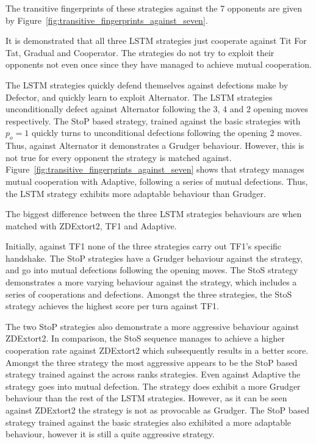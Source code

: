 The transitive fingerprints of these strategies against the 7 opponents are
given by Figure~\ref{fig:transitive_fingerprints_against_seven}.

It is
demonstrated that all three LSTM strategies just cooperate against Tit For Tat,
Gradual and Cooperator. The strategies do not try to exploit their opponents not
even once since they have managed to achieve mutual cooperation.

The LSTM strategies quickly defend themselves against defections make by
Defector, and quickly learn to exploit Alternator. The LSTM strategies
unconditionally defect against Alternator following the 3, 4 and 2 opening moves
respectively. The StoP based strategy, trained against the basic strategies with
$p_o=1$ quickly turns to unconditional defections following the opening 2 moves.
Thus, against Alternator it demonstrates a Grudger behaviour. However, this is
not true for every opponent the strategy is matched against.
Figure~\ref{fig:transitive_fingerprints_against_seven} shows that strategy
manages mutual cooperation with Adaptive, following a series of mutual
defections. Thus, the LSTM strategy exhibits more adaptable behaviour than
Grudger.

The biggest difference between the three LSTM strategies behaviours are when
matched with ZDExtort2, TF1 and Adaptive.

Initially, against TF1 none of the
three strategies carry out TF1's specific handshake. The StoP strategies have a Grudger
behaviour against the strategy, and go into mutual defections following the
opening moves. The StoS strategy demonstrates a more varying behaviour against
the strategy, which includes a series of cooperations and defections. Amongst
the three strategies, the StoS strategy achieves the highest score per turn
against TF1.

The two StoP strategies also demonstrate a more aggressive behaviour against
ZDExtort2. In comparison, the StoS sequence manages to achieve a higher cooperation
rate against ZDExtort2 which subsequently results in a better score.
Amongst the three strategy the most aggressive appears to be the StoP based
strategy trained against the across ranks strategies. Even against Adaptive
the strategy goes into mutual defection. The strategy does exhibit a more Grudger
behaviour than the rest of the LSTM strategies. However, as it can be seen
against ZDExtort2 the strategy is not as provocable as Grudger. The StoP based
strategy trained against the basic strategies also exhibited a more adaptable
behaviour, however it is still a quite aggressive strategy.


